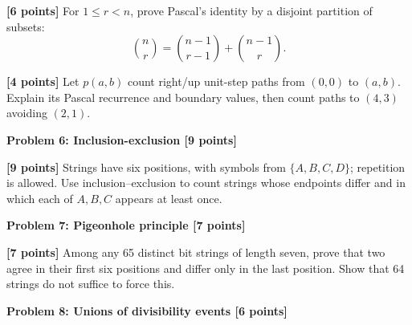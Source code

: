 \documentclass[12pt,letterpaper]{article}
\newcommand{\problemheading}[2][5\baselineskip]{\Needspace{#1}\par\noindent\hspace*{-0.625in}\textbf{#2}\par\nobreak\vspace{0.3em}}
\newcommand{\examspace}[1]{\par\vspace*{#1cm}}
\begin{document}
\begin{list}{}{\setlength{\leftmargin}{0.25in}\setlength{\rightmargin}{0.25in}}\item[]
\begin{description}[font=\normalfont,leftmargin=1.2em,labelsep=0.4em]
\item[(a)] \textbf{[6 points]} For $1\le r<n$, prove Pascal's identity by a disjoint partition of subsets:\[\binom nr=\binom{n-1}{r-1}+\binom{n-1}{r}.\]
\examspace{4}
\Needspace{\dimexpr 4cm+4\baselineskip\relax}
\item[(b)] \textbf{[4 points]} Let $p(a,b)$ count right/up unit-step paths from $(0,0)$ to $(a,b)$. Explain its Pascal recurrence and boundary values, then count paths to $(4,3)$ avoiding $(2,1)$.
\examspace{4}
\end{description}
\end{list}
\clearpage
\vspace*{0.21in}
\problemheading{Problem 6: Inclusion-exclusion [9 points]}
\begin{list}{}{\setlength{\leftmargin}{0.25in}\setlength{\rightmargin}{0.25in}}\item[]
\begin{description}[font=\normalfont,leftmargin=1.2em,labelsep=0.4em]
\item[] \textbf{[9 points]} Strings have six positions, with symbols from $\{A,B,C,D\}$; repetition is allowed. Use inclusion--exclusion to count strings whose endpoints differ and in which each of $A,B,C$ appears at least once.
\examspace{7}
\end{description}
\end{list}
\clearpage
\vspace*{0.21in}
\problemheading{Problem 7: Pigeonhole principle [7 points]}
\begin{list}{}{\setlength{\leftmargin}{0.25in}\setlength{\rightmargin}{0.25in}}\item[]
\begin{description}[font=\normalfont,leftmargin=1.2em,labelsep=0.4em]
\item[] \textbf{[7 points]} Among any 65 distinct bit strings of length seven, prove that two agree in their first six positions and differ only in the last position. Show that 64 strings do not suffice to force this.
\examspace{7}
\end{description}
\end{list}
\clearpage
\vspace*{0.21in}
\problemheading{Problem 8: Unions of divisibility events [6 points]}
\end{document}
